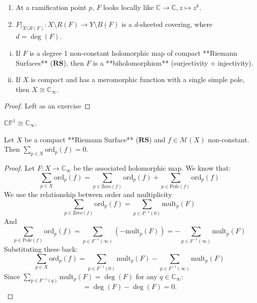 \documentclass{article}
\begin{document}
\begin{remark}
\begin{enumerate}
    \item At a ramification point $p$, $F$ looks locally like $\mathbb{C} \to \mathbb{C}, z \mapsto z^k$.
    \item $F|_{X \setminus R(F)}: X \setminus R(F) \to Y \setminus B(F)$ is a $d$-sheeted covering, where $d = \deg(F)$.
\end{enumerate}
\end{remark}

\begin{corollary}
\begin{enumerate}[i)]
    \item If $F$ is a degree 1 non-constant holomorphic map of compact **Riemann Surfaces** ($\mathbf{RS}$), then $F$ is a **biholomorphism** (surjectivity + injectivity).
    \item If $X$ is compact and has a meromorphic function with a single simple pole, then $X \cong \mathbb{C}_{\infty}$.
\end{enumerate}
\end{corollary}

\begin{proof}
    Left as an exercise
\end{proof}

\begin{corollary}
$\mathbb{C}\mathbb{P}^1 \cong \mathbb{C}_{\infty}$.
\end{corollary}

\begin{corollary}
Let $X$ be a compact **Riemann Surface** ($\mathbf{RS}$) and $f \in \mathcal{M}(X)$ non-constant.
Then $\sum_{p \in X} \text{ord}_p(f) = 0$.
\end{corollary}

\begin{proof}
Let $F: X \to \mathbb{C}_{\infty}$ be the associated holomorphic map.
We know that:
$$
\sum_{p \in X} \text{ord}_p(f) = \sum_{p \in \text{Zero}(f)} \text{ord}_p(f) + \sum_{p \in \text{Pole}(f)} \text{ord}_p(f)
$$
We use the relationship between order and multiplicity
$$
\sum_{p \in \text{Zero}(f)} \text{ord}_p(f) = \sum_{p \in F^{-1}(0)} \text{mult}_p(F)
$$
And
$$
\sum_{p \in \text{Pole}(f)} \text{ord}_p(f) = \sum_{p \in F^{-1}(\infty)} (-\text{mult}_p(F)) = -\sum_{p \in F^{-1}(\infty)} \text{mult}_p(F)
$$
Substituting these back:
$$
\sum_{p \in X} \text{ord}_p(f) = \sum_{p \in F^{-1}(0)} \text{mult}_p(F) - \sum_{p \in F^{-1}(\infty)} \text{mult}_p(F)
$$
Since $\sum_{p \in F^{-1}(q)} \text{mult}_p(F) = \deg(F)$ for any $q \in \mathbb{C}_{\infty}$:
$$
= \deg(F) - \deg(F) = 0.
$$
\end{proof}
\end{document}

